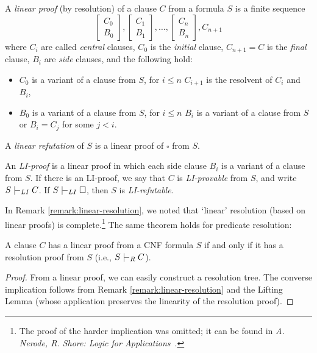 \begin{definition}
    A \emph{linear proof} (by resolution) of a clause $C$ from a formula $S$ is a finite sequence
    $$
    \begin{bmatrix}
        C_0 \\
        B_0
    \end{bmatrix},
    \begin{bmatrix}
        C_1 \\
        B_1
    \end{bmatrix},\dots,
    \begin{bmatrix}
        C_n \\
        B_n
    \end{bmatrix},
    C_{n+1}
    $$
    where $C_i$ are called \emph{central} clauses, $C_0$ is the \emph{initial} clause, $C_{n+1}=C$ is the \emph{final} clause, $B_i$ are \emph{side} clauses, and the following hold:
    \begin{itemize}
        \item $C_0$ is a variant of a clause from $S$, for $i\leq n$ $C_{i+1}$ is the resolvent of $C_i$ and $B_i$,
        \item $B_0$ is a variant of a clause from $S$, for $i\leq n$ $B_i$ is a variant of a clause from $S$ or $B_i=C_j$ for some $j<i$. 
    \end{itemize}
    A \emph{linear refutation} of $S$ is a linear proof of $\square$ from $S$.
    
    An \emph{LI-proof} is a linear proof in which each side clause $B_i$ is a variant of a clause from $S$. If there is an LI-proof, we say that $C$ is \emph{LI-provable} from $S$, and write $S\proves_{LI}C$. If $S\proves_{LI}\square$, then $S$ is \emph{LI-refutable}.
\end{definition}

In Remark \ref{remark:linear-resolution}, we noted that `linear' resolution (based on linear proofs) is complete.\footnote{The proof of the harder implication was omitted; it can be found in \emph{A. Nerode, R. Shore: Logic for Applications}~\cite{nerode_logic_2012}.} The same theorem holds for predicate resolution:

\begin{theorem}
A clause $C$ has a linear proof from a CNF formula $S$ if and only if it has a resolution proof from $S$ (i.e., $S\proves_R C$).
\end{theorem}
\begin{proof}
From a linear proof, we can easily construct a resolution tree. The converse implication follows from Remark \ref{remark:linear-resolution} and the Lifting Lemma (whose application preserves the linearity of the resolution proof).
\end{proof}

